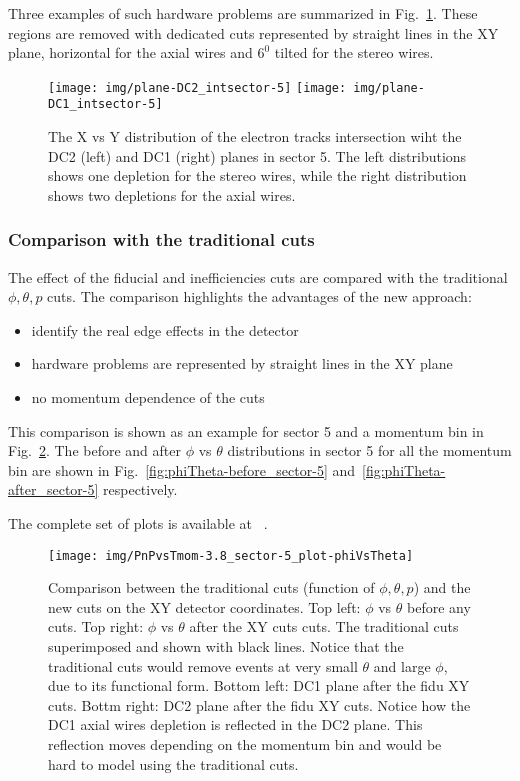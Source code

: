 Three examples of such hardware problems are summarized in Fig.~\ref{fig:xy_dc12_s5}.
These regions are removed with dedicated cuts represented by straight lines in the XY plane,
horizontal for the axial wires and $6^0$ tilted for the stereo wires.


\begin{figure}[ht]
    \centering
    \texttt{[image: img/plane-DC2\_intsector-5]}
    \texttt{[image: img/plane-DC1\_intsector-5]}
    \caption{The X vs Y distribution of the electron tracks intersection wiht the DC2 (left)
        and DC1 (right) planes in sector 5. The left distributions shows one depletion for the stereo wires,
        while the right distribution shows two depletions for the axial wires.}
    \label{fig:xy_dc12_s5}
\end{figure}

\subsubsection{Comparison with the traditional cuts}

The effect of the fiducial and inefficiencies cuts are compared with the traditional $\phi, \theta, p$ cuts.
The comparison highlights the advantages of the new approach:

\begin{itemize}
    \item identify the real edge effects in the detector
    \item hardware problems are represented by straight lines in the XY plane
    \item no momentum dependence of the cuts
\end{itemize}
This comparison is shown as an example for sector 5 and a momentum bin in Fig.~\ref{fig:PnPvsTmom-3.8_sector-5_plot-phiVsTheta}.
The before and after $\phi$ vs $\theta$ distributions in sector 5 for all the momentum bin are shown in Fig.~\ref{fig:phiTheta-before_sector-5}
and~\ref{fig:phiTheta-after_sector-5} respectively.

The complete set of plots is available at ~\cite{bib:pi0_resonance_fiducial_electron}.

\begin{figure}[ht]
    \centering
    \texttt{[image: img/PnPvsTmom-3.8\_sector-5\_plot-phiVsTheta]}
    \caption{Comparison between the traditional cuts (function of $\phi, \theta, p$) and the new cuts on the XY detector coordinates.
    Top left:  $\phi$ vs $\theta$ before any cuts. Top right:  $\phi$ vs $\theta$ after the XY cuts cuts. The traditional cuts superimposed
    and shown with black lines. Notice that the traditional cuts would remove events at very small $\theta$ and large $\phi$, due to its functional form.
    Bottom left: DC1 plane after the fidu XY cuts. Bottm right: DC2 plane after the fidu XY cuts.
    Notice how the DC1 axial wires depletion is reflected in the DC2 plane. This reflection moves depending on the momentum bin and would be hard to model
    using the traditional cuts.}
    \label{fig:PnPvsTmom-3.8_sector-5_plot-phiVsTheta}
\end{figure}


